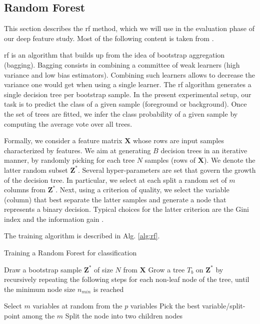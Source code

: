 \subsection{Random Forest}
\label{sec:rf}
This section describes the \gls{rf} method, which we will use in the evaluation phase of our deep feature study.
Most of the following content is taken from \cite{hastie09}.

\gls{rf} is an algorithm that builds up from the idea of bootstrap aggregation (bagging).
Bagging consists in combining a committee of weak learners (high variance and low bias estimators).
Combining such learners allows to decrease the variance one would get when using a single learner.
The \gls{rf} algorithm generates a single decision tree per bootstrap sample.
In the present experimental setup, our task is to predict the class of a given sample (foreground or background).
Once the set of trees are fitted, we infer the class probability of a given sample by computing the average vote over all trees.

Formally, we consider a feature matrix $\bm{X}$ whose rows are input samples characterized by features.
We aim at generating $B$ decision trees in an iterative manner, by randomly picking for each tree $N$ samples (rows of $\bm{X}$).
We denote the latter random subset $\bm{Z}^{*}$.
Several hyper-parameters are set that govern the growth of the decision tree.
In particular, we select at each split a random set of $m$ columns from $\bm{Z}^{*}$.
Next, using a criterion of quality, we select the variable (column) that best separate the latter samples and generate a node that represents a binary decision.
Typical choices for the latter criterion are the Gini index and the information gain \cite{raileanu04}.

The training algorithm is described in Alg. \ref{alg:rf}.

\begin{algorithm}[H]
 \caption{Training a Random Forest for classification}
 \label{alg:rf}
 \begin{algorithmic}[1]
        \State Draw a bootstrap sample $\bm{Z}^{*}$ of size $N$ from $\bm{X}$
        \State Grow a tree $T_{b}$ on $\bm{Z}^{*}$ by recursively repeating the following steps for each non-leaf node of the tree, until the minimum node size $n_{min}$ is reached
        \begin{algsubstates}
                \State Select $m$ variables at random from the $p$ variables
                \State Pick the best variable/split-point among the $m$
                \State Split the node into two children nodes
            \end{algsubstates}
    \EndFor
  \end{algorithmic}
\end{algorithm}




